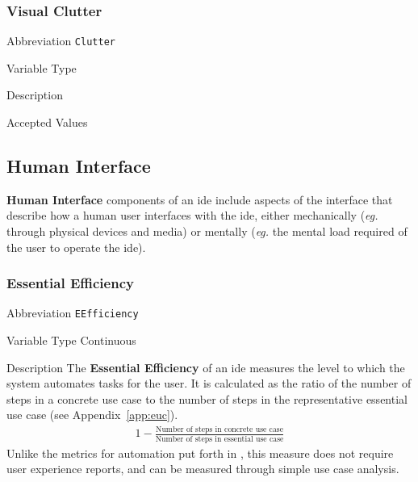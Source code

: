\subsubsection{Visual Clutter}
\label{subsec:clutter}

\begin{AlignedDesc}
  \item[Abbreviation] \texttt{Clutter}

  \item[Variable Type]

  \item[Description]

  \item[Accepted Values]

  \begin{AlignedDesc}
    \item[\textellipsis]
  \end{AlignedDesc}

\end{AlignedDesc}


\subsection{Human Interface}
\label{sec:humaninterface}

\textbf{Human Interface} components of an \ac{ide} include aspects of the
interface that describe how a human user interfaces with the \ac{ide},
either mechanically (\textit{eg.} through physical devices and media) or
mentally (\textit{eg.} the mental load required of the user to operate the
\ac{ide}).

\subsubsection{Essential Efficiency}
\label{subsec:eefficiency}

\begin{AlignedDesc}
  \item[Abbreviation] \texttt{EEfficiency}

  \item[Variable Type] Continuous

  \item[Description] The \textbf{Essential Efficiency} of an \ac{ide}
  measures the level to which the system automates tasks for the user. It
  is calculated as the ratio of the number of steps in a concrete use case
  to the number of steps in the representative essential use case (see
  Appendix~\ref{app:euc}). \cite{constantine1996}
%
  \begin{align*}
    1 - \frac{\text{Number of steps in concrete use case}}
             {\text{Number of steps in essential use case}}
  \end{align*}
%
  Unlike the metrics for automation put forth in \cite{Wei1998}, this
  measure does not require user experience reports, and can be measured
  through simple use case analysis.

\end{AlignedDesc}

